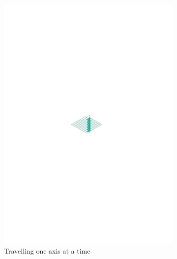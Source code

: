 \begin{figure}
\centering
\begin{subfigure}{.33\textwidth}
  \centering
  \includegraphics[scale=1]{figures/dda_precise.pdf}
  \caption{Travelling one axis at a time}
  \label{fig:precision1}
\end{subfigure}%
\begin{subfigure}{.33\textwidth}
  \centering

\end{subfigure}
\end{figure}
